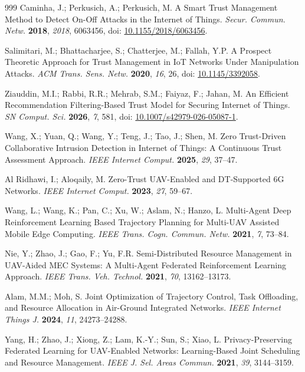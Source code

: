 \documentclass[notspecified,article,submit,moreauthors]{Definitions/mdpi}
\begin{document}
\begin{thebibliography}{999}
Caminha, J.; Perkusich, A.; Perkusich, M. A Smart Trust Management Method to Detect On-Off Attacks in the Internet of Things. {\em Secur. Commun. Netw.} {\bf 2018}, {\em 2018}, 6063456, doi: \href{https://doi.org/10.1155/2018/6063456}{10.1155/2018/6063456}.

Salimitari, M.; Bhattacharjee, S.; Chatterjee, M.; Fallah, Y.P. A Prospect Theoretic Approach for Trust Management in IoT Networks Under Manipulation Attacks. {\em ACM Trans. Sens. Netw.} {\bf 2020}, {\em 16}, 26, doi: \href{https://doi.org/10.1145/3392058}{10.1145/3392058}.

Ziauddin, M.I.; Rabbi, R.R.; Mehrab, S.M.; Faiyaz, F.; Jahan, M. An Efficient Recommendation Filtering-Based Trust Model for Securing Internet of Things. {\em SN Comput. Sci.} {\bf 2026}, {\em 7}, 581, doi: \href{https://doi.org/10.1007/s42979-026-05087-1}{10.1007/s42979-026-05087-1}.

Wang, X.; Yuan, Q.; Wang, Y.; Teng, J.; Tao, J.; Shen, M. Zero Trust-Driven Collaborative Intrusion Detection in Internet of Things: A Continuous Trust Assessment Approach. {\em IEEE Internet Comput.} {\bf 2025}, {\em 29}, 37--47.

Al Ridhawi, I.; Aloqaily, M. Zero-Trust UAV-Enabled and DT-Supported 6G Networks. {\em IEEE Internet Comput.} {\bf 2023}, {\em 27}, 59--67.

Wang, L.; Wang, K.; Pan, C.; Xu, W.; Aslam, N.; Hanzo, L. Multi-Agent Deep Reinforcement Learning Based Trajectory Planning for Multi-UAV Assisted Mobile Edge Computing. {\em IEEE Trans. Cogn. Commun. Netw.} {\bf 2021}, {\em 7}, 73--84.

Nie, Y.; Zhao, J.; Gao, F.; Yu, F.R. Semi-Distributed Resource Management in UAV-Aided MEC Systems: A Multi-Agent Federated Reinforcement Learning Approach. {\em IEEE Trans. Veh. Technol.} {\bf 2021}, {\em 70}, 13162--13173.

Alam, M.M.; Moh, S. Joint Optimization of Trajectory Control, Task Offloading, and Resource Allocation in Air-Ground Integrated Networks. {\em IEEE Internet Things J.} {\bf 2024}, {\em 11}, 24273--24288.

Yang, H.; Zhao, J.; Xiong, Z.; Lam, K.-Y.; Sun, S.; Xiao, L. Privacy-Preserving Federated Learning for UAV-Enabled Networks: Learning-Based Joint Scheduling and Resource Management. {\em IEEE J. Sel. Areas Commun.} {\bf 2021}, {\em 39}, 3144--3159.


\end{thebibliography}
\end{document}
